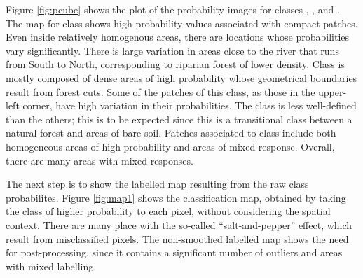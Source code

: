 \documentclass[
  shortnames]{jss}
\begin{document}
Figure \ref{fig:pcube} shows the plot of the probability images for classes , ,  and . The map for class  shows high probability values associated with compact patches. Even inside relatively homogenous areas, there are locations whose probabilities vary significantly. There is large variation in areas close to the river that runs from South to North, corresponding to riparian forest of lower density. Class  is mostly composed of dense areas of high probability whose geometrical boundaries result from forest cuts. Some of the patches of this class, as those in the upper-left corner, have high variation in their probabilities. The class  is less well-defined than the others; this is to be expected since this is a transitional class between a natural forest and areas of bare soil. Patches associated to class  include both homogeneous areas of high probability and areas of mixed response. Overall, there are many areas with mixed responses.

The next step is to show the labelled map resulting from the raw class probabilites. Figure \ref{fig:map1} shows the classification map, obtained by taking the class of higher probability to each pixel, without considering the spatial context. There are many place with the so-called ``salt-and-pepper'' effect, which result from misclassified pixels. The non-smoothed labelled map shows the need for post-processing, since it contains a significant number of outliers and areas with mixed labelling.
\end{document}
